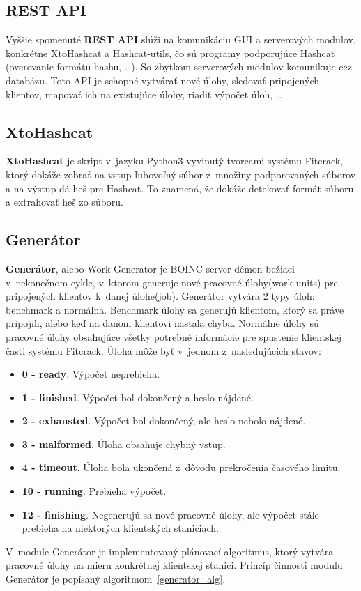 \subsection{REST API}
\label{API}
Vyššie spomenuté \textbf{REST API} slúži na komunikáciu GUI a serverových modulov, konkrétne XtoHashcat a Hashcat-utils, čo sú programy podporujúce Hashcat (overovanie formátu hashu, …).
So zbytkom serverových modulov komunikuje cez databázu.
Toto API je schopné vytvárať nové úlohy, sledovať pripojených klientov, mapovať ich na existujúce úlohy, riadiť výpočet úloh, …

\subsection{XtoHashcat}
\label{xtohashcat}
\textbf{XtoHashcat} je skript v~jazyku Python3 vyvinutý tvorcami systému Fitcrack, ktorý dokáže zobrať na vstup ľubovoľný súbor z~množiny podporovaných súborov a na výstup dá heš pre Hashcat.
To znamená, že dokáže detekovať formát súboru a extrahovať heš zo súboru.

\subsection{Generátor}
\label{generator}
\textbf{Generátor}, alebo Work Generator je BOINC server démon bežiaci v~nekonečnom cykle, v~ktorom generuje nové pracovné úlohy(work units) pre pripojených klientov k~danej úlohe(job).
Generátor vytvára 2 typy úloh: benchmark a normálna.
Benchmark úlohy sa generujú klientom, ktorý sa práve pripojili, alebo keď na danom klientovi nastala chyba.
Normálne úlohy sú pracovné úlohy obsahujúce všetky potrebné informácie pre spustenie klientskej časti systému Fitcrack.
Úloha môže byť v~jednom z~nasledujúcich stavov:
\begin{itemize}
	\item \textbf{0 - ready}. Výpočet neprebieha.
	\item \textbf{1 - finished}. Výpočet bol dokončený a heslo nájdené.
	\item \textbf{2 - exhausted}. Výpočet bol dokončený, ale heslo nebolo nájdené.
	\item \textbf{3 - malformed}. Úloha obsahuje chybný vstup.
	\item \textbf{4 - timeout}. Úloha bola ukončená z~dôvodu prekročenia časového limitu.
	\item \textbf{10 - running}. Prebieha výpočet.
	\item \textbf{12 - finishing}. Negenerujú sa nové pracovné úlohy, ale výpočet stále prebieha na niektorých klientských staniciach.
\end{itemize}
V~module Generátor je implementovaný plánovací algoritmus, ktorý vytvára pracovné úlohy na mieru konkrétnej klientskej stanici.
Princíp činnosti modulu Generátor je popísaný algoritmom~\ref{generator_alg}.

